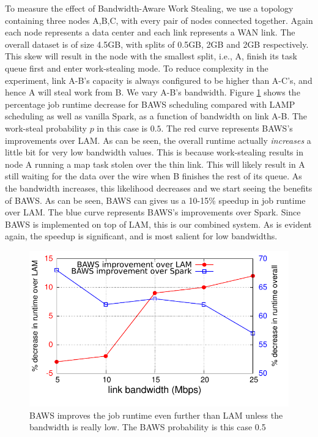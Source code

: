 To measure the effect of Bandwidth-Aware Work Stealing, we use a topology containing three nodes A,B,C, with every pair of nodes connected together. 
Again each node represents a data center and each link represents a WAN link. The overall dataset is of size 4.5GB, with splits of 0.5GB, 2GB and 2GB respectively. This skew will result in the node with the smallest split, i.e., A, finish its task queue first and enter work-stealing mode. To reduce complexity in the experiment, link A-B's capacity is always configured to be higher than A-C's, and hence A will steal work from B. We vary A-B's bandwidth.  
Figure \ref{fig:baws} shows the percentage job runtime decrease for BAWS scheduling compared with LAMP scheduling as well as vanilla Spark, 
as a function of bandwidth on link A-B. The work-steal probability $p$ in this case is $0.5$. 
The red curve represents BAWS's improvements over LAM. As can be seen, the overall runtime actually \emph{increases} a little bit for very low bandwidth values.
This is because work-stealing results in node A running a map task stolen over the thin link. This will likely result in A still waiting for the data over the wire when B finishes the rest of its queue. As the bandwidth increases, this likelihood decreases and we start seeing the benefits of BAWS.
As can be seen, BAWS can gives us a 10-15\% speedup in job runtime over LAM. The blue curve represents BAWS's improvements over
Spark. Since BAWS is implemented on top of LAM, this is our combined system. As is evident again, the speedup is significant, and is most salient
for low bandwidths.


\begin{figure}[!ht]
\centering\includegraphics[width=\columnwidth]{figs/baws.pdf}
\vspace{-1.2em}
\caption{BAWS improves the job runtime even further than LAM unless the bandwidth is really low. The BAWS probability is this case 0.5}
\label{fig:baws}
\vspace{.7em}
\end{figure}

